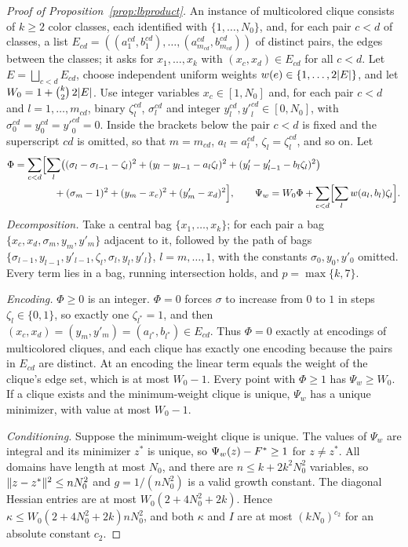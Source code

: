 \begin{proof}[Proof of Proposition~\ref{prop:lbproduct}]
An instance of multicolored clique consists of $k\ge2$ color classes, each
identified with $\{1,\dots,N_0\}$, and, for each pair $c<d$ of classes, a
list $E_{cd}=((a^{cd}_1,b^{cd}_1),\dots,(a^{cd}_{m_{cd}},b^{cd}_{m_{cd}}))$
of distinct pairs, the edges between the classes; it asks for
$x_1,\dots,x_k$ with $(x_c,x_d)\in E_{cd}$ for all $c<d$. Let
$E=\bigsqcup_{c<d}E_{cd}$, choose independent uniform weights
$w(e)\in\{1,\dots,2\lvert E\rvert\}$, and let $W_0=1+\binom k2\,2\lvert E\rvert$. Use integer
variables $x_c\in[1,N_0]$ and, for each pair $c<d$ and $l=1,\dots,m_{cd}$,
binary $\zeta^{cd}_l$, $\sigma^{cd}_l$ and integer
$y^{cd}_l,{y'}^{cd}_l\in[0,N_0]$, with $\sigma^{cd}_0=y^{cd}_0={y'}^{cd}_0=0$.
Inside the brackets below the pair $c<d$ is fixed and the superscript $cd$
is omitted, so that $m=m_{cd}$, $a_l=a^{cd}_l$, $\zeta_l=\zeta^{cd}_l$, and so
on. Let
\begin{align*}
\Phi&=\sum_{c<d}\Bigl[\sum_{l}\bigl((\sigma_l-\sigma_{l-1}-\zeta_l)^2
+(y_l-y_{l-1}-a_l\zeta_l)^2+(y'_l-y'_{l-1}-b_l\zeta_l)^2\bigr)\\
&\qquad\qquad+(\sigma_m-1)^2+(y_m-x_c)^2+(y'_m-x_d)^2\Bigr],\qquad
\Psi_w=W_0\Phi+\sum_{c<d}\Bigl[\sum_lw(a_l,b_l)\zeta_l\Bigr] .
\end{align*}
\emph{Decomposition.} Take a central bag $\{x_1,\dots,x_k\}$; for each pair a
bag $\{x_c,x_d,\sigma_m,y_m,y'_m\}$ adjacent to it, followed by the path of
bags $\{\sigma_{l-1},y_{l-1},y'_{l-1},\zeta_l,\sigma_l,y_l,y'_l\}$,
$l=m,\dots,1$, with the constants $\sigma_0,y_0,y'_0$ omitted. Every term lies
in a bag, running intersection holds, and $p=\max\{k,7\}$.

\emph{Encoding.} $\Phi\ge0$ is an integer. $\Phi=0$ forces $\sigma$ to
increase from $0$ to $1$ in steps $\zeta_l\in\{0,1\}$, so exactly one
$\zeta_{l^*}=1$, and then $(x_c,x_d)=(y_m,y'_m)=(a_{l^*},b_{l^*})\in E_{cd}$.
Thus $\Phi=0$ exactly at encodings of multicolored cliques, and each clique has
exactly one encoding because the pairs in $E_{cd}$ are distinct. At an
encoding the linear term equals the weight of the clique's edge set, which is
at most $W_0-1$. Every point with $\Phi\ge1$ has $\Psi_w\ge W_0$. If a clique
exists and the minimum-weight clique is unique, $\Psi_w$ has a unique
minimizer, with value at most $W_0-1$.

\emph{Conditioning.} Suppose the minimum-weight clique is unique. The values
of $\Psi_w$ are integral and its minimizer $z^*$ is unique, so
$\Psi_w(z)-F^{*}\ge1$ for $z\ne z^*$. All domains have length at most $N_0$,
and there are $n\le k+2k^2N_0^2$ variables, so
$\lVert z-z^*\rVert^2\le nN_0^2$ and $g=1/(nN_0^2)$ is a valid growth constant.
The diagonal Hessian entries are at most $W_0(2+4N_0^2+2k)$. Hence
$\kappa\le W_0(2+4N_0^2+2k)nN_0^2$, and both $\kappa$ and $I$ are at most
$(kN_0)^{c_2}$ for an absolute constant $c_2$.


\end{proof}
